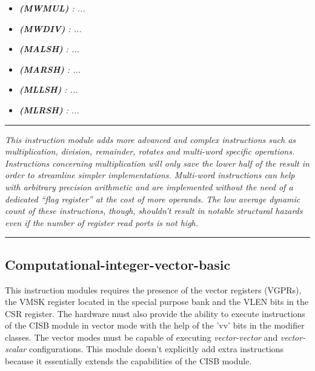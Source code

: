 \begin{multicols}{2}
\begin{itemize}
                \item \textit{\textbf{(MWMUL) }: ...}

                \item \textit{\textbf{(MWDIV) }: ...}

                \item \textit{\textbf{(MALSH) }: ...}

                \item \textit{\textbf{(MARSH) }: ...}

                \item \textit{\textbf{(MLLSH) }: ...}
                
                \item \textit{\textbf{(MLRSH) }: ...}

            \end{itemize}  

        \end{multicols}

    \par\noindent\rule{\textwidth}{0.4pt}
    \textit{This instruction module adds more advanced and complex instructions such as multiplication, division, remainder, rotates and multi-word specific operations. Instructions concerning multiplication will only save the lower half of the result in order to streamline simpler implementations. Multi-word instructions can help with arbitrary precision arithmetic and are implemented without the need of a dedicated ``flag register'' at the cost of more operands. The low average dynamic count of these instructions, though, shouldn't result in notable structural hazards even if the number of register read ports is not high.}
    \par\noindent\rule{\textwidth}{0.4pt}

    \subsection{Computational-integer-vector-basic}

        This instruction modules requires the presence of the vector registers (VGPRs), the VMSK register located in the special purpose bank and the VLEN bits in the CSR register. The hardware must also provide the ability to execute instructions of the CISB module in vector mode with the help of the 'vv' bits in the modifier classes. The vector modes must be capable of executing \textit{vector-vector} and \textit{vector-scalar} configurations. This module doesn't explicitly add extra instructions because it essentially extends the capabilities of the CISB module.

